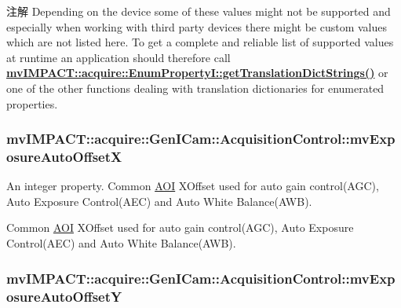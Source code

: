 \begin{DoxyNote}{注解}
Depending on the device some of these values might not be supported and especially when working with third party devices there might be custom values which are not listed here. To get a complete and reliable list of supported values at runtime an application should therefore call {\bfseries \hyperlink{classmv_i_m_p_a_c_t_1_1acquire_1_1_enum_property_i_a0ba6ccbf5ee69784d5d0b537924d26b6}{mv\+I\+M\+P\+A\+C\+T\+::acquire\+::\+Enum\+Property\+I\+::get\+Translation\+Dict\+Strings()}} or one of the other functions dealing with translation dictionaries for enumerated properties. 
\end{DoxyNote}
\hypertarget{classmv_i_m_p_a_c_t_1_1acquire_1_1_gen_i_cam_1_1_acquisition_control_abe7efb253397a6338ecc8ccdf91d518e}{
\subsubsection[{mv\+Exposure\+Auto\+Offset\+X}]{ mv\+I\+M\+P\+A\+C\+T\+::acquire\+::\+Gen\+I\+Cam\+::\+Acquisition\+Control\+::mv\+Exposure\+Auto\+Offset\+X}}\label{classmv_i_m_p_a_c_t_1_1acquire_1_1_gen_i_cam_1_1_acquisition_control_abe7efb253397a6338ecc8ccdf91d518e}


An integer property. Common \hyperlink{struct_a_o_i}{A\+O\+I} X\+Offset used for auto gain control(\+A\+G\+C), Auto Exposure Control(\+A\+E\+C) and Auto White Balance(\+A\+W\+B). 

Common \hyperlink{struct_a_o_i}{A\+O\+I} X\+Offset used for auto gain control(\+A\+G\+C), Auto Exposure Control(\+A\+E\+C) and Auto White Balance(\+A\+W\+B). \hypertarget{classmv_i_m_p_a_c_t_1_1acquire_1_1_gen_i_cam_1_1_acquisition_control_aed46caaafedd6a8089cd33fe5c5fb7df}{
\subsubsection[{mv\+Exposure\+Auto\+Offset\+Y}]{ mv\+I\+M\+P\+A\+C\+T\+::acquire\+::\+Gen\+I\+Cam\+::\+Acquisition\+Control\+::mv\+Exposure\+Auto\+Offset\+Y}}\label{classmv_i_m_p_a_c_t_1_1acquire_1_1_gen_i_cam_1_1_acquisition_control_aed46caaafedd6a8089cd33fe5c5fb7df}


